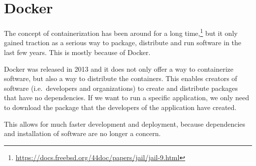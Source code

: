 \section{Docker}\label{background:docker}
The concept of containerization has been around for a long time,\footnote{\url{https://docs.freebsd.org/44doc/papers/jail/jail-9.html}} but it only gained traction as a serious way to package, distribute and run software in the last few years. This is mostly because of Docker.

\medskip

Docker was released in 2013 and it does not only offer a way to containerize software, but also a way to distribute the containers. This enables creators of software (i.e.\ developers and organizations) to create and distribute packages that have no dependencies. If we want to run a specific application, we only need to download the package that the developers of the application have created.

This allows for much faster development and deployment, because dependencies and installation of software are no longer a concern.










